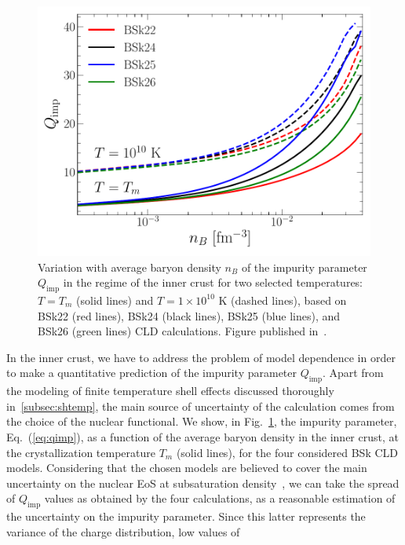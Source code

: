 \begin{figure}[!t]
  \begin{center}
    \includegraphics[width=0.9\linewidth]{figures/qimp_icrust.pdf}
  \end{center}
  \caption[Impurity parameter versus baryon density in the inner-crust 
  regime]{Variation with average baryon density $n_B$ of the impurity
    parameter $Q_{\text{imp}}$ in the regime of the inner crust for two
    selected temperatures: $T=T_m$ (solid lines) and $T=1\times 10^{10}$ 
    \si{\kelvin} (dashed lines), based on BSk22 (red lines), BSk24 (black 
    lines), BSk25 (blue lines), and BSk26 (green lines) CLD calculations.
    Figure published in~\cite{Carreau2020}.}\label{fig:qimp_icrust}
\end{figure}
%
In the inner crust, we have to address the problem of model dependence in 
order to make a quantitative prediction of the impurity parameter 
$Q_{\text{imp}}$. 
Apart from the modeling of finite temperature shell effects discussed 
thoroughly in~\ref{subsec:shtemp}, the main source of uncertainty 
of the calculation comes from the choice of the nuclear functional. We show, 
in Fig.~\ref{fig:qimp_icrust}, the impurity parameter, Eq.~(\ref{eq:qimp}), as 
a function of the average baryon density in the inner crust, at the 
crystallization temperature $T_m$ (solid lines), for the four considered BSk 
CLD models. 
Considering that the chosen models are believed to cover the main uncertainty 
on the nuclear EoS at subsaturation density~\cite{Pearson2018}, we can take the 
spread of $Q_{\text{imp}}$ values as obtained by the four calculations, as a 
reasonable estimation of the uncertainty on the impurity parameter. Since this 
latter represents the variance of the charge distribution, low values of
